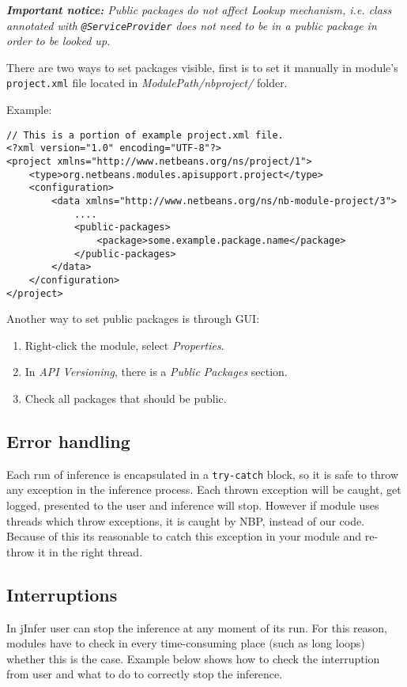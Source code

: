 \documentclass[a4paper,10pt,oneside]{article}
\begin{document}
\textit{
  \textbf{Important notice:} Public packages do not affect
  Lookup mechanism, i.e.
  class annotated with \texttt{@ServiceProvider}
  does not need to be in a public package in order to be looked up.
}
\par 
  There are two ways to set packages visible, first is to set it manually in
  module's \texttt{project.xml} file located in
  \textit{ModulePath/nbproject/} folder.

\noindent Example:
\begin{verbatim}
// This is a portion of example project.xml file.
<?xml version="1.0" encoding="UTF-8"?>
<project xmlns="http://www.netbeans.org/ns/project/1">
    <type>org.netbeans.modules.apisupport.project</type>
    <configuration>
        <data xmlns="http://www.netbeans.org/ns/nb-module-project/3">
            ....
            <public-packages>
                <package>some.example.package.name</package>
            </public-packages>
        </data>
    </configuration>
</project>
\end{verbatim}
\par 
\noindent  Another way to set public packages is through GUI:
  \begin{enumerate}
    \item Right-click the module, select \textit{Properties}.
    \item In \textit{API Versioning}, there is a \textit{Public Packages} section.
    \item Check all packages that should be public.
  \end{enumerate}

\subsection*{Error handling}
\par 
  Each run of inference is encapsulated in a \texttt{try-catch} block,
  so it is safe to throw any exception in the inference process.
  Each thrown exception will be caught, get logged, presented to the user and
  inference will stop. However if module uses threads which throw exceptions,
  it is caught by NBP, instead of our code. Because of this its reasonable to
  catch this exception in your module and re-throw it in the right thread.

\subsection*{Interruptions}
\par 
  In jInfer user can stop the inference at any moment of its run. For this
  reason, modules have to check in every time-consuming place (such as long loops)
  whether this is the case. Example below shows how to check the interruption
  from user and what to do to correctly stop the inference.
\end{document}
